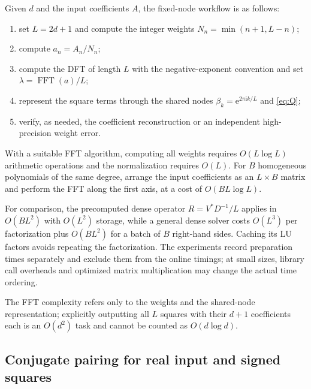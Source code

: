 \documentclass[10pt,twoside,final]{siamart1116}
\numberwithin{equation}{section}
\numberwithin{theorem}{section}
\newcommand{\e}{\mathrm e}
\newcommand{\ii}{\mathrm i}
\begin{document}
Given $d$ and the input coefficients $A$, the fixed-node workflow is as follows:
\begin{enumerate}
\item set $L=2d+1$ and compute the integer weights $N_n=\min(n+1,L-n)$;
\item compute $a_n=A_n/N_n$;
\item compute the DFT of length $L$ with the negative-exponent convention and set
$\lambda=\operatorname{FFT}(a)/L$;
\item represent the square terms through the shared nodes $\beta_k=\e^{2\pi\ii k/L}$
and \eqref{eq:Q};
\item verify, as needed, the coefficient reconstruction or an independent
high-precision weight error.
\end{enumerate}
With a suitable FFT algorithm, computing all weights requires $O(L\log L)$ arithmetic
operations and the normalization requires $O(L)$. For $B$ homogeneous polynomials of the
same degree, arrange the input coefficients as an $L\times B$ matrix and perform the FFT
along the first axis, at a cost of $O(BL\log L)$.

For comparison, the precomputed dense operator $R=V^*D^{-1}/L$ applies in $O(BL^2)$
with $O(L^2)$ storage, while a general dense solver costs $O(L^3)$ per factorization
plus $O(BL^2)$ for a batch of $B$ right-hand sides. Caching its LU factors avoids
repeating the factorization. The experiments record preparation times separately
and exclude them from the online timings; at small sizes, library call overheads and
optimized matrix multiplication may change the actual time ordering.

The FFT complexity refers only to the weights and the shared-node representation;
explicitly outputting all $L$ squares with their $d+1$ coefficients each is an $O(d^2)$
task and cannot be counted as $O(d\log d)$.

\subsection{Conjugate pairing for real input and signed squares}
\end{document}
